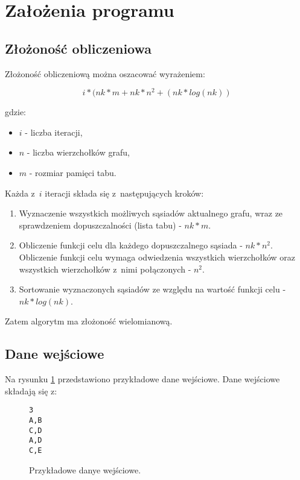 \section{Założenia programu}

\subsection{Złożoność obliczeniowa}

Złożoność obliczeniową można oszacować wyrażeniem:

\begin{equation}
	i * (nk * m + nk * n^2 + (nk * log(nk))
\end{equation}

\noindent gdzie:

\begin{itemize}
 \item $i$ - liczba iteracji,
 \item $n$ - liczba wierzchołków grafu,
 \item $m$ - rozmiar pamięci tabu.
\end{itemize}

\noindent Każda z~$i$ iteracji składa się z~następujących kroków:

\begin{enumerate}
 \item Wyznaczenie wszystkich możliwych sąsiadów aktualnego grafu, wraz ze sprawdzeniem dopuszczalności (lista tabu) - $nk * m$.
 \item Obliczenie funkcji celu dla każdego dopuszczalnego sąsiada - $nk * n^2$. Obliczenie funkcji celu wymaga odwiedzenia wszystkich wierzchołków oraz wszystkich wierzchołków z~nimi połączonych - $n^2$.
 \item Sortowanie wyznaczonych sąsiadów ze względu na wartość funkcji celu - $nk * log(nk)$.
\end{enumerate}

\noindent Zatem algorytm ma złożoność wielomianową. 

\subsection{Dane wejściowe}

Na rysunku \ref{fig:input_data} przedstawiono przykładowe dane wejściowe. Dane wejściowe składają się z:

\begin{figure}[ht!]
	\begin{Verbatim}[frame=single]
3
A,B
C,D
A,D
C,E 
	\end{Verbatim}
	\caption{Przykładowe danye wejściowe.}
	\label{fig:input_data}
\end{figure}

